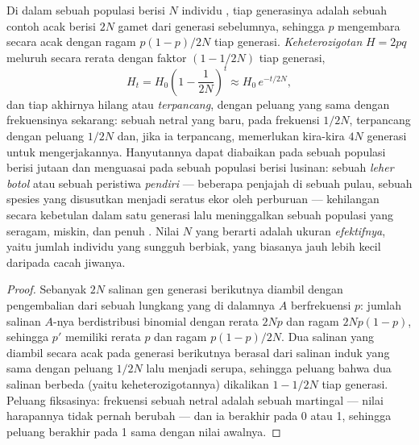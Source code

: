 \begin{theorem}\label{thm:b2:population-genetics:drift}
Di dalam sebuah populasi berisi $N$ individu , 
tiap generasinya adalah sebuah contoh acak berisi $2N$ gamet dari
generasi sebelumnya, sehingga $p$ mengembara secara acak dengan ragam
$p(1 - p)/2N$ tiap generasi. \emph{Keheterozigotan} $H = 2pq$ meluruh
secara rerata dengan faktor $(1 - 1/2N)$ tiap generasi,
\[
H_t = H_0\left(1 - \frac{1}{2N}\right)^{t} \approx H_0\,e^{-t/2N},
\]
dan tiap  akhirnya hilang atau \emph{terpancang}, dengan peluang
yang sama dengan frekuensinya sekarang: sebuah  netral yang baru,
pada frekuensi $1/2N$, terpancang dengan peluang $1/2N$ dan, jika ia
terpancang, memerlukan kira-kira $4N$ generasi untuk mengerjakannya.
Hanyutannya dapat diabaikan pada sebuah populasi berisi jutaan dan
menguasai pada sebuah populasi berisi lusinan: sebuah \emph{leher
botol} atau sebuah peristiwa \emph{pendiri} --- beberapa penjajah di
sebuah pulau, sebuah spesies yang disusutkan menjadi seratus ekor oleh
perburuan --- kehilangan  secara kebetulan dalam satu generasi lalu
meninggalkan sebuah populasi yang seragam, miskin, dan penuh .
Nilai $N$ yang berarti adalah ukuran \emph{efektifnya}, yaitu jumlah
individu yang sungguh berbiak, yang biasanya jauh lebih kecil daripada
cacah jiwanya.
\end{theorem}
\begin{proof}
Sebanyak $2N$ salinan gen generasi berikutnya diambil dengan
pengembalian dari sebuah lungkang yang di dalamnya $A$ berfrekuensi
$p$: jumlah salinan $A$-nya berdistribusi binomial dengan rerata $2Np$
dan ragam $2Np(1 - p)$, sehingga $p'$ memiliki rerata $p$ dan ragam
$p(1 - p)/2N$. Dua salinan yang diambil secara acak pada generasi
berikutnya berasal dari salinan induk yang sama dengan peluang $1/2N$
lalu menjadi serupa, sehingga peluang bahwa dua salinan berbeda (yaitu
keheterozigotannya) dikalikan $1 - 1/2N$ tiap generasi. Peluang
fiksasinya: frekuensi sebuah  netral adalah sebuah martingal ---
nilai harapannya tidak pernah berubah --- dan ia berakhir pada 0 atau
1, sehingga peluang berakhir pada 1 sama dengan nilai awalnya.
\end{proof}

